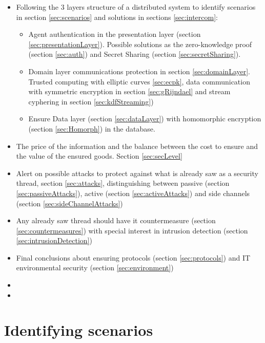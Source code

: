\documentclass[10pt,a4paper,twoside]{llncs}
\begin{document}
\begin{itemize}
    \item Following the 3 layers structure of a distributed system \cite{TanenbaumDistr} to identify scenarios in section \ref{sec:scenarios} and solutions in sections \ref{sec:intercom}:
    \begin{itemize}
        \item Agent authentication in the presentation layer (section \ref{sec:presentationLayer}). Possible solutions as the zero-knowledge proof (section \ref{sec:auth}) and Secret Sharing (section \ref{sec:secretSharing}).
        \item Domain layer communications protection in section \ref{sec:domainLayer}. Trusted computing with elliptic curves \ref{sec:ecpk}, data communication with symmetric encryption in section \ref{sec:gRijndael} and stream cyphering in section \ref{sec:kdfStreaming})
        \item Ensure Data layer (section \ref{sec:dataLayer}) with homomorphic encryption (section \ref{sec:Homorph}) in the database.
    \end{itemize}
    \item The price of the information and the balance between the cost to ensure and the value of the ensured goods. Section \ref{sec:secLevel}
    \item Alert on possible attacks to protect against what is already saw as a security thread, section \ref{sec:attacks}, distinguishing between passive (section \ref{sec:passiveAttacks}), active (section \ref{sec:activeAttacks}) and side channels (section \ref{sec:sideChannelAttacks})
    \item Any already saw thread should have it countermeasure (section \ref{sec:countermeasures}) with special interest in intrusion detection (section \ref{sec:intrusionDetection})
    \item Final conclusions about ensuring protocols (section \ref{sec:protocols}) and IT environmental security (section \ref{sec:environment})
    \item
    \item
\end{itemize}

%
\section{Identifying scenarios \label{sec:scenarios}}
\end{document}
